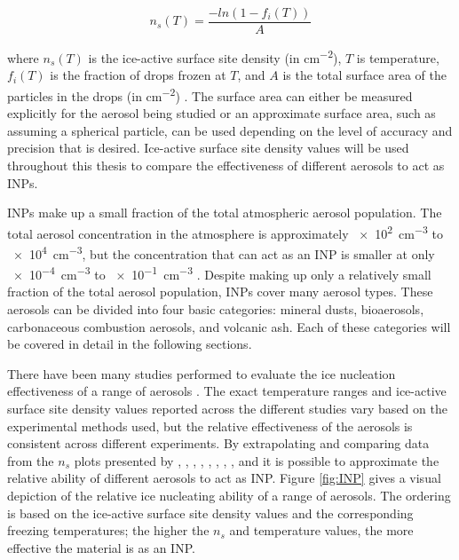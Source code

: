 \begin{equation}
\label{eq:ns}
n_s(T) = \frac{-ln(1-f_i(T))}{A}
\end{equation}

where $n_s(T)$ is the ice-active surface site density (in \si{cm^{-2}}), $T$ is temperature, $f_i(T)$ is the fraction of drops frozen at $T$, and $A$ is the total surface area of the particles in the drops (in \si{cm^{-2}}) \citep{con2009}. The surface area can either be measured explicitly for the aerosol being studied or an approximate surface area, such as assuming a spherical particle, can be used depending on the level of accuracy and precision that is desired. Ice-active surface site density values will be used throughout this thesis to compare the effectiveness of different aerosols to act as INPs.

INPs make up a small fraction of the total atmospheric aerosol population. The total aerosol concentration in the atmosphere is approximately \SI{e2}{cm^{-3}} to \SI{e4}{cm^{-3}}, but the concentration that can act as an INP is smaller at only \SI{e-4}{cm^{-3}} to \SI{e-1}{cm^{-3}} \citep{mur2012}. Despite making up only a relatively small fraction of the total aerosol population, INPs cover many aerosol types. These aerosols can be divided into four basic categories: mineral dusts, bioaerosols, carbonaceous combustion aerosols, and volcanic ash. Each of these categories will be covered in detail in the following sections.

There have been many studies performed to evaluate the ice nucleation effectiveness of a range of aerosols \citep[e.g.][]{dieh2002, knop2011,mur2012,pumm2012,atk2013,aug2014,emer2015,whal2015,zol2015}. The exact temperature ranges and ice-active surface site density values reported across the different studies vary based on the experimental methods used, but the relative effectiveness of the aerosols is consistent across different experiments. By extrapolating and comparing data from the $n_s$ plots presented by \cite{dieh2002}, \cite{knop2011}, \cite{mur2012}, \cite{pumm2012}, \cite{atk2013}, \cite{aug2014}, \cite{emer2015}, \cite{whal2015}, and \cite{zol2015} it is possible to approximate the relative ability of different aerosols to act as INP. Figure \ref{fig:INP} gives a visual depiction of the relative ice nucleating ability of a range of aerosols. The ordering is based on the ice-active surface site density values and the corresponding freezing temperatures; the higher the $n_s$ and temperature values, the more effective the material is as an INP.


